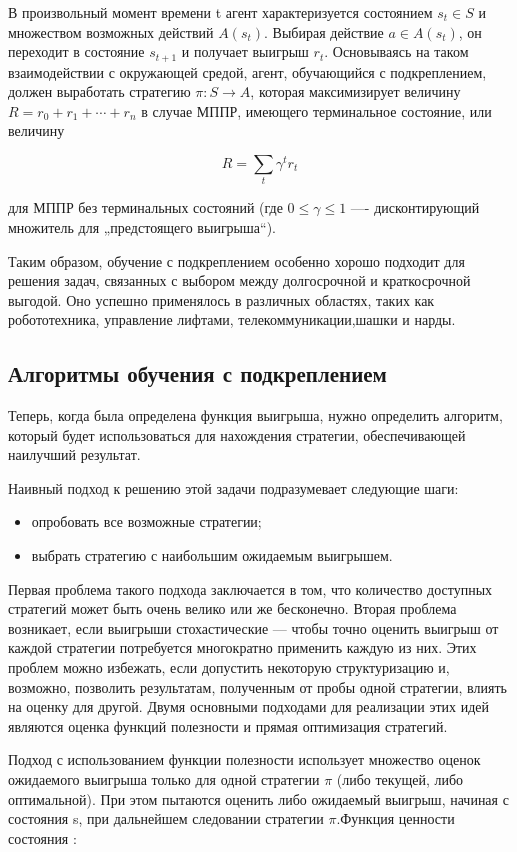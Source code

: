 \documentclass[a4paper,12pt]{article}
\begin{document}
В произвольный момент времени t агент характеризуется состоянием $s_t \in S$ и множеством возможных действий $A(s_t)$. Выбирая действие $a \in A(s_t)$, он переходит в состояние $s_{t+1}$ и получает выигрыш $r_t$. Основываясь на таком взаимодействии с окружающей средой, агент, обучающийся с подкреплением, должен выработать стратегию $\pi: S \to A$, которая максимизирует величину $R=r_0 + r_1+\cdots+r_n$ в случае МППР, имеющего терминальное состояние, или величину

        $$R=\sum_t \gamma^t r_t$$

для МППР без терминальных состояний (где $0 \leq \gamma \leq 1$ —- дисконтирующий множитель для „предстоящего выигрыша“).

Таким образом, обучение с подкреплением особенно хорошо подходит для решения задач, связанных с выбором между долгосрочной и краткосрочной выгодой. Оно успешно применялось в различных областях, таких как робототехника, управление лифтами, телекоммуникации,шашки и нарды. 
\newpage
\subsection{Алгоритмы обучения с подкреплением}
Теперь, когда была определена функция выигрыша, нужно определить алгоритм, который будет использоваться для нахождения стратегии, обеспечивающей наилучший результат.

Наивный подход к решению этой задачи подразумевает следующие шаги:
\begin{itemize}
    \item опробовать все возможные стратегии;
    \item выбрать стратегию с наибольшим ожидаемым выигрышем. 
\end{itemize}
    
Первая проблема такого подхода заключается в том, что количество доступных стратегий может быть очень велико или же бесконечно. Вторая проблема возникает, если выигрыши стохастические — чтобы точно оценить выигрыш от каждой стратегии потребуется многократно применить каждую из них. Этих проблем можно избежать, если допустить некоторую структуризацию и, возможно, позволить результатам, полученным от пробы одной стратегии, влиять на оценку для другой. Двумя основными подходами для реализации этих идей являются оценка функций полезности и прямая оптимизация стратегий.

Подход с использованием функции полезности использует множество оценок ожидаемого выигрыша только для одной стратегии $\pi$ (либо текущей, либо оптимальной). При этом пытаются оценить либо ожидаемый выигрыш, начиная с состояния s, при дальнейшем следовании стратегии $\pi$.Функция ценности состояния :
\end{document}
